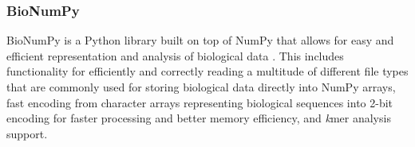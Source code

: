 \subsubsection{BioNumPy} \label{background:implementation_tools_and_libraries:bionumpy}
BioNumPy is a Python library built on top of NumPy that allows for easy and efficient representation and analysis of biological data \cite{bionumpy}.
This includes functionality for efficiently and correctly reading a multitude of different file types that are commonly used for storing biological data directly into NumPy arrays, fast encoding from character arrays representing biological sequences into 2-bit encoding for faster processing and better memory efficiency, and \textit{k}mer analysis support.
